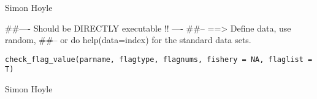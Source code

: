 \documentclass[a4paper]{book}
\begin{document}
%
\begin{Arguments}
\begin{ldescription}
\item[\code{parfile}] 


\item[\code{repfile}] 


\item[\code{frqfile}] 


\item[\code{parlim}] 


\end{ldescription}
\end{Arguments}
%
\begin{Author}\relax
Simon Hoyle

\end{Author}
%
\begin{Examples}
\begin{ExampleCode}
##---- Should be DIRECTLY executable !! ----
##-- ==>  Define data, use random,
##--	or do  help(data=index)  for the standard data sets.

\end{ExampleCode}
\end{Examples}
%
\begin{Usage}
\begin{verbatim}
check_flag_value(parname, flagtype, flagnums, fishery = NA, flaglist = T)
\end{verbatim}
\end{Usage}
%
\begin{Arguments}
\begin{ldescription}
\item[\code{parname}] 


\item[\code{flagtype}] 


\item[\code{flagnums}] 


\item[\code{fishery}] 


\item[\code{flaglist}] 


\end{ldescription}
\end{Arguments}
%
\begin{Author}\relax
Simon Hoyle

\end{Author}
\end{document}

